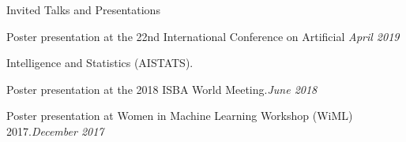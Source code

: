 \documentclass{resume} %
\begin{document}
\begin{rSection}{Invited Talks and Presentations}

Poster presentation at the 22nd International Conference on Artificial  \hfill {\em April 2019}

\vspace{-0.1in}
Intelligence and Statistics (AISTATS).



Poster presentation at the 2018 ISBA World Meeting.\hfill {\em June 2018}


Poster presentation at Women in Machine Learning Workshop (WiML) 2017.\hfill {\em December 2017}

\end{rSection}


\end{document}
